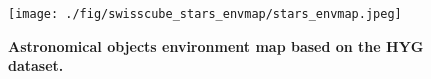 
\begin{figure}[t]
    \begin{center}
    \texttt{[image: ./fig/swisscube\_stars\_envmap/stars\_envmap.jpeg]}
    \end{center}
    \vspace{-6mm}
    \caption{{\bf Astronomical objects environment map based on the HYG dataset.} 
    }
    \label{fig:swisscube_stars_envmap}
\end{figure}
